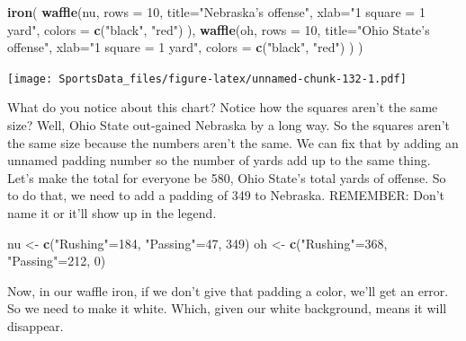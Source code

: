 \documentclass[
]{book}
\newenvironment{Shaded}{\begin{snugshade}}{\end{snugshade}}
\newcommand{\DataTypeTok}[1]{\textcolor[rgb]{0.13,0.29,0.53}{#1}}
\newcommand{\DecValTok}[1]{\textcolor[rgb]{0.00,0.00,0.81}{#1}}
\newcommand{\KeywordTok}[1]{\textcolor[rgb]{0.13,0.29,0.53}{\textbf{#1}}}
\newcommand{\NormalTok}[1]{#1}
\newcommand{\StringTok}[1]{\textcolor[rgb]{0.31,0.60,0.02}{#1}}
\begin{document}
\begin{Shaded}
\begin{Highlighting}[]
\KeywordTok{iron}\NormalTok{(}
 \KeywordTok{waffle}\NormalTok{(nu, }
        \DataTypeTok{rows =} \DecValTok{10}\NormalTok{, }
        \DataTypeTok{title=}\StringTok{"Nebraska's offense"}\NormalTok{, }
        \DataTypeTok{xlab=}\StringTok{"1 square = 1 yard"}\NormalTok{, }
        \DataTypeTok{colors =} \KeywordTok{c}\NormalTok{(}\StringTok{"black"}\NormalTok{, }\StringTok{"red"}\NormalTok{)}
\NormalTok{        ),}
 \KeywordTok{waffle}\NormalTok{(oh, }
        \DataTypeTok{rows =} \DecValTok{10}\NormalTok{, }
        \DataTypeTok{title=}\StringTok{"Ohio State's offense"}\NormalTok{, }
        \DataTypeTok{xlab=}\StringTok{"1 square = 1 yard"}\NormalTok{, }
        \DataTypeTok{colors =} \KeywordTok{c}\NormalTok{(}\StringTok{"black"}\NormalTok{, }\StringTok{"red"}\NormalTok{)}
\NormalTok{        )}
\NormalTok{)}
\end{Highlighting}
\end{Shaded}

\texttt{[image: SportsData\_files/figure-latex/unnamed-chunk-132-1.pdf]}

What do you notice about this chart? Notice how the squares aren't the same size? Well, Ohio State out-gained Nebraska by a long way. So the squares aren't the same size because the numbers aren't the same. We can fix that by adding an unnamed padding number so the number of yards add up to the same thing. Let's make the total for everyone be 580, Ohio State's total yards of offense. So to do that, we need to add a padding of 349 to Nebraska. REMEMBER: Don't name it or it'll show up in the legend.

\begin{Shaded}
\begin{Highlighting}[]
\NormalTok{nu <-}\StringTok{ }\KeywordTok{c}\NormalTok{(}\StringTok{"Rushing"}\NormalTok{=}\DecValTok{184}\NormalTok{, }\StringTok{"Passing"}\NormalTok{=}\DecValTok{47}\NormalTok{, }\DecValTok{349}\NormalTok{)}
\NormalTok{oh <-}\StringTok{ }\KeywordTok{c}\NormalTok{(}\StringTok{"Rushing"}\NormalTok{=}\DecValTok{368}\NormalTok{, }\StringTok{"Passing"}\NormalTok{=}\DecValTok{212}\NormalTok{, }\DecValTok{0}\NormalTok{)}
\end{Highlighting}
\end{Shaded}

Now, in our waffle iron, if we don't give that padding a color, we'll get an error. So we need to make it white. Which, given our white background, means it will disappear.
\end{document}
